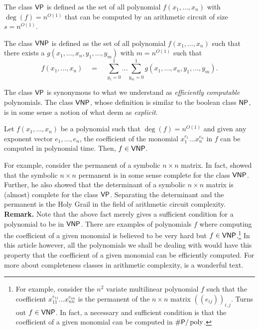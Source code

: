 \begin{definition}
The class $\mathsf{VP}$ is defined as the set of all polynomial $f(x_1,\dots, x_n)$ with $\deg(f) = n^{O(1)}$ that can be computed by an arithmetic circuit of size $s = n^{O(1)}$. 

The class $\mathsf{VNP}$ is defined as the set of all polynomial $f(x_1,\dots, x_n)$ such that there exists a $g(x_1,\dots, x_n, y_1,\dots, y_m)$ with $m = n^{O(1)}$ such that
\[
f(x_1,\dots, x_n) \quad = \quad \sum_{y_1=0}^1\dots \sum_{y_m=0}^1 g(x_1,\dots, x_n, y_1,\dots, y_m).
\]
\end{definition}
The class $\mathsf{VP}$ is synonymous to what we understand as \emph{efficiently computable} polynomials. 
The class $\mathsf{VNP}$, whose definition is similar to the boolean class $\mathsf{NP}$, is in some sense a notion of what deem as \emph{explicit}. 

\begin{fact}
Let $f(x_1,\dots, x_n)$ be a polynomial such that $\deg(f) = n^{O(1)}$ and given any exponent vector $e_1,\dots, e_n$, the coefficient of the monomial $x_1^{e_1}\dots x_n^{e_n}$ in $f$ can be computed in polynomial time. 
Then, $f \in \mathsf{VNP}$. 
\end{fact}

For example, consider the permanent of a symbolic $n\times n$ matrix. 
In fact, \cite{v79} showed that the symbolic $n\times n$ permanent is in some sense complete for the class $\mathsf{VNP}$. 
Further, he also showed that the determinant of a symbolic  $n\times n$ matrix is (almost) complete for the class $\mathsf{VP}$. 
Separating the determinant and the permanent is the Holy Grail in the field of arithmetic circuit complexity. \\

{\bf Remark.} Note that the above fact merely gives a sufficient condition for a polynomial to be in $\mathsf{VNP}$. 
There are examples of polynomials $f$ where computing the coefficient of a given monomial is believed to be very hard but $f\in \mathsf{VNP}$.\footnote{For example, consider the $n^2$ variate multilinear polynomial $f$ such that the coefficient $x_{11}^{e_{11}}\dots x_{nn}^{e_{nn}}$ is the permanent of the $n\times n$ matrix $(\!(e_{ij})\!)_{i,j}$. 
Turns out $f \in \mathsf{VNP}$. 
In fact, a necessary and sufficient condition is that the coefficient of a given monomial can be computed in $\#\mathsf{P}/\operatorname{poly}$. }  In this article however, all the polynomials we shall be dealing with would have this property that the coefficient of a given monomial can be efficiently computed. 
For more about completeness classes in arithmetic complexity, \cite{bcs97} is a wonderful text. 


